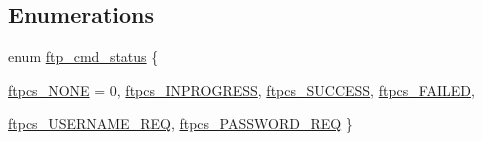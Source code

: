 \subsection*{Enumerations}
\begin{DoxyCompactItemize}
\item 
enum \hyperlink{group__ftp_ga6ba091973f82254c93d262d863c0de06}{ftp\_\-cmd\_\-status} \{ \par
\hyperlink{group__ftp_gga6ba091973f82254c93d262d863c0de06a844915b7f33a80407deec70c6951923e}{ftpcs\_\-NONE} =  0, 
\hyperlink{group__ftp_gga6ba091973f82254c93d262d863c0de06abed3f90d1064f0c656d245cd235c17f1}{ftpcs\_\-INPROGRESS}, 
\hyperlink{group__ftp_gga6ba091973f82254c93d262d863c0de06a8bf1e38a8bd301fe7888baa53a0459f5}{ftpcs\_\-SUCCESS}, 
\hyperlink{group__ftp_gga6ba091973f82254c93d262d863c0de06a584f14178b706fe90959de96fa88f28f}{ftpcs\_\-FAILED}, 
\par
\hyperlink{group__ftp_gga6ba091973f82254c93d262d863c0de06a10c55b5e6b693b50804ff9bd24be8716}{ftpcs\_\-USERNAME\_\-REQ}, 
\hyperlink{group__ftp_gga6ba091973f82254c93d262d863c0de06a46e451d4bde835dca2b25126b4a35b3e}{ftpcs\_\-PASSWORD\_\-REQ}
 \}
\end{DoxyCompactItemize}
